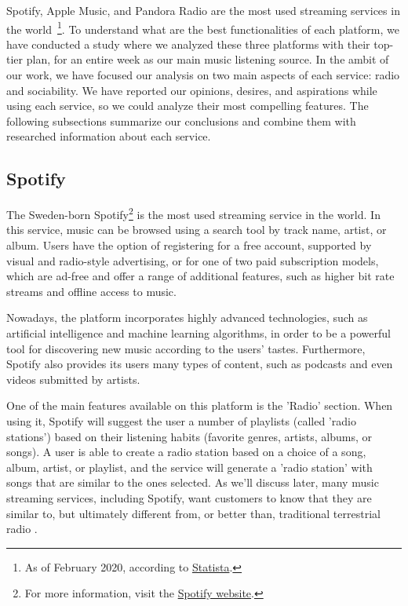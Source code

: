 Spotify, Apple Music, and Pandora Radio are the most used streaming services in the world~\footnote{As of February 2020, according to  \href{http://www.statista.com/chart/20826/music-streaming-services-with-most-subscribers-global-fipp/}{Statista}.}. To understand what are the best functionalities of each platform, we have conducted a study where we analyzed these three platforms with their top-tier plan, for an entire week as our main music listening source. In the ambit of our work, we have focused our analysis on two main aspects of each service: radio and sociability. We have reported our opinions, desires, and aspirations while using each service, so we could analyze their most compelling features. The following subsections summarize our conclusions and combine them with researched information about each service.

\subsection{Spotify}
The Sweden-born Spotify\footnote{For more information, visit the \href{https://www.spotify.com/}{Spotify website}.} is the most used streaming service in the world. In this service, music can be browsed using a search tool by track name, artist, or album. Users have the option of registering for a free account, supported by visual and radio-style advertising, or for one of two paid subscription models, which are ad-free and offer a range of additional features, such as higher bit rate streams and offline access to music. ~\cite{Swanson2013}

Nowadays, the platform incorporates highly advanced technologies, such as artificial intelligence and machine learning algorithms, in order to be a powerful tool for discovering new music according to the users' tastes. Furthermore, Spotify also provides its users many types of content, such as podcasts and even videos submitted by artists.

One of the main features available on this platform is the 'Radio' section. When using it, Spotify will suggest the user a number of playlists (called 'radio stations') based on their listening habits (favorite genres, artists, albums, or songs). A user is able to create a radio station based on a choice of a song, album, artist, or playlist, and the service will generate a 'radio station' with songs that are similar to the ones selected. As we'll discuss later, many music streaming services, including Spotify, want customers to know that they are similar to, but ultimately different from, or better than, traditional terrestrial radio \cite{Glantz2016}.

